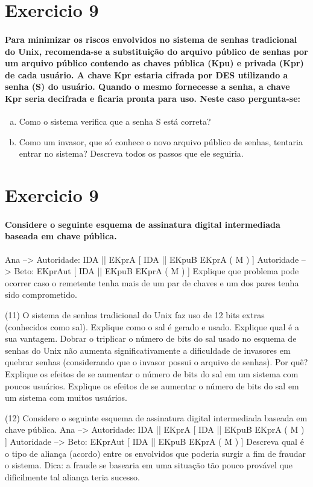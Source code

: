\documentclass[10pt,a4paper]{report}
\begin{document}
\section*{Exercicio 9}
\paragraph{ Para minimizar os riscos envolvidos no sistema de senhas tradicional do Unix, recomenda-se a substituição do arquivo público de senhas por um arquivo público contendo as chaves pública (Kpu) e privada (Kpr) de cada usuário. A chave Kpr estaria cifrada por DES utilizando a senha (S) do usuário. Quando o mesmo fornecesse a senha, a chave Kpr seria decifrada e ficaria pronta para uso. Neste caso pergunta-se:}
\begin{enumerate}[(a)]
\item Como o sistema verifica que a senha S está correta?
\item Como um invasor, que só conhece o novo arquivo público de senhas, tentaria entrar no sistema? Descreva todos os passos que ele seguiria.
\end{enumerate}
\section*{Exercicio 9}
\paragraph{ Considere o seguinte esquema de assinatura digital intermediada baseada em chave pública.}
Ana --> Autoridade: IDA || EKprA [ IDA || EKpuB { EKprA ( M ) } ]
Autoridade --> Beto: EKprAut [ IDA || EKpuB { EKprA ( M ) } ]
Explique que problema pode ocorrer caso o remetente tenha mais de um par de chaves e um dos pares tenha sido comprometido.

(11) O sistema de senhas tradicional do Unix faz uso de 12 bits extras (conhecidos como sal).
Explique como o sal é gerado e usado.
Explique qual é a sua vantagem.
Dobrar o triplicar o número de bits do sal usado no esquema de senhas do Unix não aumenta significativamente a dificuldade de invasores em quebrar senhas (considerando que o invasor possui o arquivo de senhas). Por quê?
Explique os efeitos de se aumentar o número de bits do sal em um sistema com poucos usuários.
Explique os efeitos de se aumentar o número de bits do sal em um sistema com muitos usuários.

(12) Considere o seguinte esquema de assinatura digital intermediada baseada em chave pública.
Ana --> Autoridade: IDA || EKprA [ IDA || EKpuB { EKprA ( M ) } ]
Autoridade --> Beto: EKprAut [ IDA || EKpuB { EKprA ( M ) } ]
Descreva qual é o tipo de aliança (acordo) entre os envolvidos que poderia surgir a fim de fraudar o sistema. Dica: a fraude se basearia em uma situação tão pouco provável que dificilmente tal aliança teria sucesso.
\end{document}

